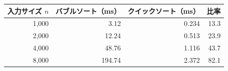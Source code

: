 \begin{tabular}{rrrr}
\toprule
入力サイズ $n$ & バブルソート（ms） & クイックソート（ms） & 比率 \\
\midrule
1,000 & 3.12 & 0.234 & 13.3 \\
2,000 & 12.24 & 0.513 & 23.9 \\
4,000 & 48.76 & 1.116 & 43.7 \\
8,000 & 194.74 & 2.372 & 82.1 \\
\bottomrule
\end{tabular}
